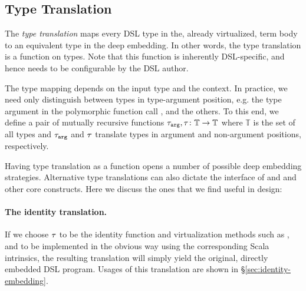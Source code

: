 \subsection{Type Translation}
\label{sec:type-translation}
 The \emph{type translation} maps every DSL type in the, already
  virtualized, term body to an equivalent type in the deep embedding.
  In other words, the type translation is a function on
  types.  Note that this function is inherently DSL-specific, and
  hence needs to be configurable by the DSL author.


  The type mapping depends on the input type and the context. In
  practice, we need only distinguish between types in type-argument
  position, e.g. the type argument  in the polymorphic
  function call , and the others.  To this end, we
  define a pair of mutually recursive functions $\ttarg, \ttother
  \colon \mathbb{T} \rightarrow \mathbb{T}$ where $\mathbb{T}$ is the
  set of all types and $\ttarg$ and $\ttother$ translate types in
  argument and non-argument positions, respectively.

  Having type translation as a function opens a number of possible deep embedding
   strategies. Alternative type translations can also dictate the interface of 
   and  and other core \edsl{} constructs. Here we discuss the ones that we find
   useful in \edsl{} design:

\paragraph{The identity translation.}  If we choose $\ttother$ to be
the identity function and virtualization methods such as ,
 and  to be implemented in the obvious way
using the corresponding Scala intrinsics, the resulting translation
will simply yield the original, directly embedded DSL program. Usages
of this translation are shown in \S \ref{sec:identity-embedding}.

